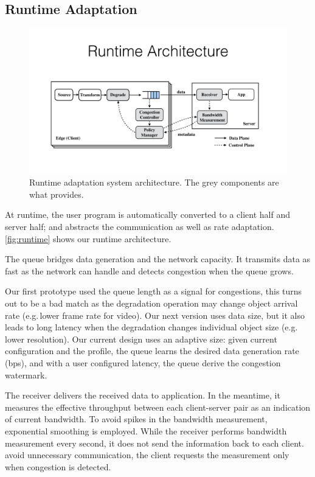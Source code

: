 \subsection{Runtime Adaptation}
\label{sec:adaptation}

\begin{figure}
  \centering
  \includegraphics[width=\linewidth]{figures/runtime-adaptation.pdf}
  \caption{Runtime adaptation system architecture. The grey components are what
    \sysname{} provides.}
  \label{fig:runtime}
\end{figure}

At runtime, the user program is automatically converted to a client half and
server half; and \sysname{} abstracts the communication as well as rate
adaptation. \autoref{fig:runtime} shows our runtime architecture.

 The queue bridges data generation and
the network capacity. It transmits data as fast as the network can handle and
detects congestion when the queue grows.

 Our first prototype used the queue length as a
signal for congestions, this turns out to be a bad match as the degradation
operation may change object arrival rate (e.g.\,lower frame rate for video). Our
next version uses data size, but it also leads to long latency when the
degradation changes individual object size (e.g.\,lower resolution). Our current
design uses an adaptive size: given current configuration and the profile, the
queue learns the desired data generation rate (bps), and with a user configured
latency, the queue derive the congestion watermark.

 The receiver delivers the received data to
application. In the meantime, it measures the effective throughput between each
client-server pair as an indication of current bandwidth. To avoid spikes in the
bandwidth measurement, exponential smoothing is employed. While the receiver
performs bandwidth measurement every second, it does not send the information
back to each client.  avoid unnecessary communication, the client requests the
measurement only when congestion is detected.

